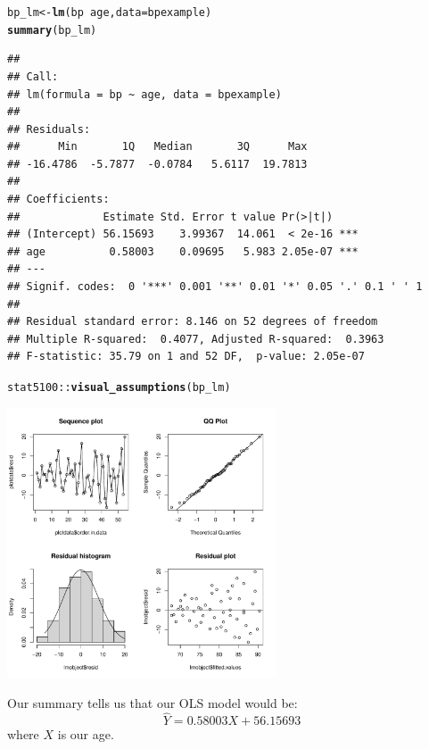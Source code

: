 \documentclass{article}\usepackage[]{graphicx}\usepackage[]{color}
\makeatletter
\newcommand{\hlopt}[1]{\textcolor[rgb]{0,0,0}{#1}}%
\newcommand{\hlstd}[1]{\textcolor[rgb]{0.345,0.345,0.345}{#1}}%
\newcommand{\hlkwb}[1]{\textcolor[rgb]{0.69,0.353,0.396}{#1}}%
\newcommand{\hlkwc}[1]{\textcolor[rgb]{0.333,0.667,0.333}{#1}}%
\newcommand{\hlkwd}[1]{\textcolor[rgb]{0.737,0.353,0.396}{\textbf{#1}}}%
\newenvironment{kframe}{%
 \def\at@end@of@kframe{}%
 \ifinner\ifhmode%
  \def\at@end@of@kframe{\end{minipage}}%
  \begin{minipage}{\columnwidth}%
 \fi\fi%
 \def\FrameCommand##1{\hskip\@totalleftmargin \hskip-\fboxsep
 \colorbox{shadecolor}{##1}\hskip-\fboxsep
     \hskip-\linewidth \hskip-\@totalleftmargin \hskip\columnwidth}%
 \MakeFramed {\advance\hsize-\width
   \@totalleftmargin\z@ \linewidth\hsize
   \@setminipage}}%
 {\par\unskip\endMakeFramed%
 \at@end@of@kframe}
\newenvironment{knitrout}{}{} %
\makeatother
\begin{document}
\begin{knitrout}
\color{fgcolor}\begin{kframe}
\begin{alltt}
\hlstd{bp_lm} \hlkwb{<-} \hlkwd{lm}\hlstd{(bp} \hlopt{~} \hlstd{age,} \hlkwc{data} \hlstd{= bpexample)}
\hlkwd{summary}\hlstd{(bp_lm)}
\end{alltt}
\begin{verbatim}
## 
## Call:
## lm(formula = bp ~ age, data = bpexample)
## 
## Residuals:
##      Min       1Q   Median       3Q      Max 
## -16.4786  -5.7877  -0.0784   5.6117  19.7813 
## 
## Coefficients:
##             Estimate Std. Error t value Pr(>|t|)    
## (Intercept) 56.15693    3.99367  14.061  < 2e-16 ***
## age          0.58003    0.09695   5.983 2.05e-07 ***
## ---
## Signif. codes:  0 '***' 0.001 '**' 0.01 '*' 0.05 '.' 0.1 ' ' 1
## 
## Residual standard error: 8.146 on 52 degrees of freedom
## Multiple R-squared:  0.4077,	Adjusted R-squared:  0.3963 
## F-statistic: 35.79 on 1 and 52 DF,  p-value: 2.05e-07
\end{verbatim}
\begin{alltt}
\hlstd{stat5100}\hlopt{::}\hlkwd{visual_assumptions}\hlstd{(bp_lm)}
\end{alltt}
\end{kframe}

{\centering \includegraphics[width=0.6\textwidth]{figure/unnamed-chunk-2-1} 

}



\end{knitrout}

Our summary tells us that our OLS model would be:
\[\hat{Y} = 0.58003 X + 56.15693\]
where $X$ is our age.
\end{document}

